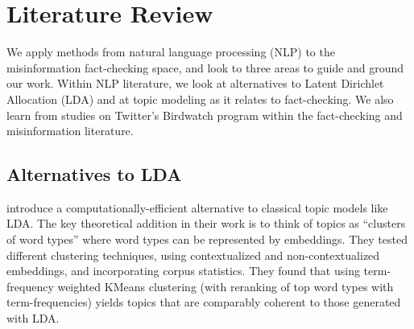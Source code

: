 \documentclass [11pt, proquest] {uwthesis}[2020/02/24]
\begin{document}







\chapter{Literature Review}

We apply methods from natural language processing (NLP) to the misinformation fact-checking space, and look to three areas to guide and ground our work.  Within NLP literature, we look at alternatives to  Latent Dirichlet Allocation (LDA) \cite{blei2003latent} and at topic modeling as it relates to fact-checking. We also learn from studies on Twitter's Birdwatch program within the fact-checking and misinformation literature.

\section{Alternatives to LDA}

 \cite{sia-etal-2020-tired} introduce a computationally-efficient alternative to classical topic models like LDA. The key theoretical addition in their work is to think of  topics as “clusters of word types” where word types can be represented by embeddings.  They tested different clustering techniques, using contextualized and non-contextualized embeddings, and incorporating  corpus statistics. They found that using term-frequency weighted KMeans clustering (with reranking of top word types with term-frequencies) yields topics that are comparably coherent to those generated with LDA.
\end{document}
